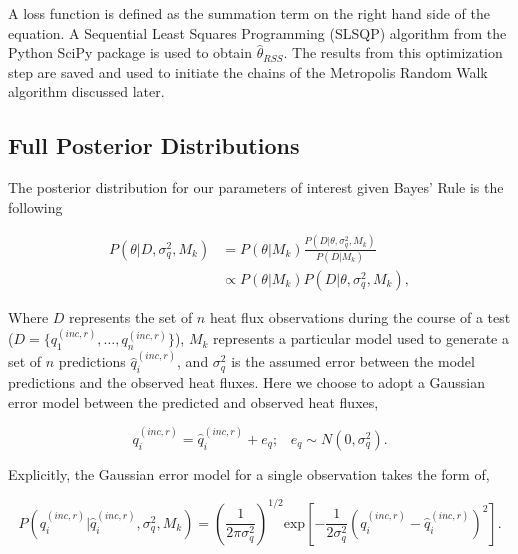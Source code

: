 \documentclass[article]{proc}
\begin{document}
        \noindent A loss function is defined as the summation term on the right hand side of the equation. A Sequential Least Squares Programming (SLSQP) algorithm from the Python SciPy package is used to obtain $\hat{\theta}_{RSS}$. The results from this optimization step are saved and used to initiate the chains of the Metropolis Random Walk algorithm discussed later. 


    \subsection{Full Posterior Distributions}

        The posterior distribution for our parameters of interest given Bayes' Rule is the following

        \begin{align}\label{eq:bayes}
            P(\theta | D, \sigma_q^2, M_k) &= P(\theta|M_k) \frac{P(D|\theta, \sigma_q^2, M_k)}{P(D|M_k)}\\
                &\propto P(\theta|M_k) P(D|\theta, \sigma_q^2, M_k),
        \end{align}

        \noindent Where $D$ represents the set of $n$ heat flux observations during the course of a test ($D = \{q^{(inc,r)}_1, \dots, q^{(inc,r)}_n \}$), $M_k$ represents a particular model used to generate a set of $n$ predictions $\hat{q}^{(inc,r)}_i$, and $\sigma_q^2$ is the assumed error between the model predictions and the observed heat fluxes. Here we choose to adopt a Gaussian error model between the predicted and observed heat fluxes,

        \begin{equation}\label{eq:model}
            q^{(inc,r)}_i = \hat{q}^{(inc,r)}_i + e_q; \hspace{10pt} e_q \sim N(0, \sigma_q^2). 
        \end{equation}

        \noindent Explicitly, the Gaussian error model for a single observation takes the form of, 

        \begin{equation}\label{eq:likelihood}
            P(q_i^{(inc,r)}| \hat{q}_i^{(inc,r)}, \sigma_q^2, M_k) = \left(\frac{1}{2 \pi \sigma_q^2} \right)^{1/2} \text{exp} \left[-\frac{1}{2 \sigma_q^2} \left( q_i^{(inc,r)} - \hat{q}_i^{(inc,r)} \right)^2 \right].
        \end{equation}
\end{document}
